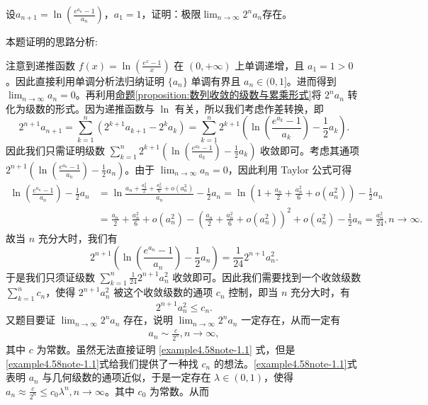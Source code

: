 \documentclass[../../main.tex]{subfiles}
\begin{document}
\begin{example}
设\(a_{n + 1}=\ln\left(\frac{e^{a_n}-1}{a_n}\right)\)，\(a_1 = 1\)，证明：极限\(\lim_{n\rightarrow\infty}2^na_n\)存在。
\end{example}
\begin{note}
本题证明的思路分析:

注意到递推函数 \(f(x)=\ln\left(\frac{e^x - 1}{x}\right)\) 在 \((0, +\infty)\) 上单调递增，且 \(a_1 = 1>0\)。因此直接利用单调分析法归纳证明 \(\{ a_n \}\) 单调有界且 \(a_n\in(0, 1]\)。进而得到 \(\lim_{n \to \infty} a_n = 0\)。再利用\hyperref[proposition:数列收敛的级数与累乘形式]{命题\ref{proposition:数列收敛的级数与累乘形式}}将 \(2^n a_n\) 转化为级数的形式。因为递推函数与 \(\ln\) 有关，所以我们考虑作差转换，即
\[
2^{n + 1} a_{n + 1} = \sum_{k = 1}^n (2^{k + 1} a_{k + 1} - 2^k a_k) = \sum_{k = 1}^n 2^{k + 1}\left(\ln\left(\frac{e^{a_k} - 1}{a_k}\right) - \frac{1}{2} a_k\right).
\]
因此我们只需证明级数 \(\sum_{k = 1}^n 2^{k + 1}\left(\ln\left(\frac{e^{a_k} - 1}{a_k}\right) - \frac{1}{2} a_k\right)\) 收敛即可。考虑其通项 \(2^{n + 1}\left(\ln\left(\frac{e^{a_n} - 1}{a_n}\right) - \frac{1}{2} a_n\right)\)。由于 \(\lim_{n \to \infty} a_n = 0\)，因此利用 Taylor 公式可得
\begin{align*}
\ln\left(\frac{e^{a_n} - 1}{a_n}\right) - \frac{1}{2} a_n &= \ln\frac{a_n+\frac{a_n^2}{2}+\frac{a_n^3}{6}+o(a_n^3)}{a_n} - \frac{1}{2} a_n
= \ln\left(1 + \frac{a_n}{2}+\frac{a_n^2}{6}+o(a_n^2)\right) - \frac{1}{2} a_n\\
&= \frac{a_n}{2}+\frac{a_n^2}{6}+o(a_n^2) - \left(\frac{a_n}{2}+\frac{a_n^2}{6}+o(a_n^2)\right)^2 + o(a_n^2) - \frac{1}{2} a_n
= \frac{a_n^2}{24}, n \to \infty.
\end{align*}
故当 \(n\) 充分大时，我们有
\[
2^{n + 1}\left(\ln\left(\frac{e^{a_n} - 1}{a_n}\right) - \frac{1}{2} a_n\right) = \frac{1}{24} 2^{n + 1} a_n^2.
\]
于是我们只须证级数 \(\sum_{k = 1}^n \frac{1}{24} 2^{n + 1} a_n^2\) 收敛即可。因此我们需要找到一个收敛级数 \(\sum_{k = 1}^n c_n\)，使得 \(2^{n + 1} a_n^2\) 被这个收敛级数的通项 \(c_n\) 控制，即当 \(n\) 充分大时，有
\[
2^{n + 1} a_n^2 \leqslant  c_n.
\]
又题目要证 \(\lim_{n \to \infty} 2^n a_n\) 存在，说明 \(\lim_{n \to \infty} 2^n a_n\) 一定存在，从而一定有
\begin{align}
a_n \sim \frac{c}{2^n}, n \to \infty, \label{example4.58note-1.1}
\end{align}
其中 \(c\) 为常数。虽然无法直接证明 \eqref{example4.58note-1.1} 式，但是 \eqref{example4.58note-1.1}式给我们提供了一种找 \(c_n\) 的想法。\eqref{example4.58note-1.1}式表明 \(a_n\) 与几何级数的通项近似，于是一定存在 \(\lambda \in (0, 1)\)，使得 \(a_n \approx \frac{c}{2^n} \leqslant  c_0 \lambda ^n, n \to \infty\)。其中 \(c_0\) 为常数。从而

\end{note}
\end{document}
